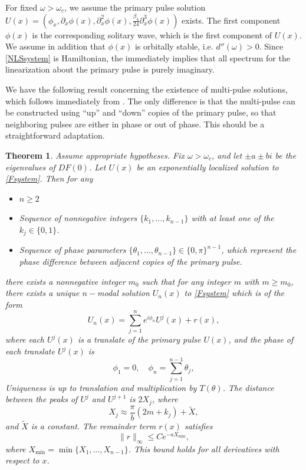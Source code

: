 \documentclass[12pt]{article}
\newtheorem{theorem}{Theorem}
\begin{document}
For fixed $\omega > \omega_c$, we assume the primary pulse solution $U(x) = (\phi_x, \partial_x \phi(x), \partial_x^2 \phi(x), \frac{\beta_4}{24} \partial_x^3 \phi(x))$ exists. The first component $\phi(x)$ is the corresponding solitary wave, which is the first component of $U(x)$. We assume in addition that $\phi(x)$ is orbitally stable, i.e. $d''(\omega) > 0$. Since \cref{NLSsystem} is Hamiltonian, the immediately implies that all spectrum for the linearization about the primary pulse is purely imaginary.

We have the following result concerning the existence of multi-pulse solutions, which follows immediately from \cite[Theorem~3.6]{SandstedeStrut}. The only difference is that the multi-pulse can be constructed using ``up'' and ``down'' copies of the primary pulse, so that neighboring pulses are either in phase or out of phase. This should be a straightforward adaptation.

\begin{theorem}\label{theorem:multiexist}
Assume appropriate hypotheses. Fix $\omega > \omega_c$, and let $\pm a \pm bi$ be the eigenvalues of $DF(0)$. Let $U(x)$ be an exponentially localized solution to \cref{Fsystem}. Then for any 
\begin{itemize}
\item $n \geq 2$
\item Sequence of nonnegative integers $\{ k_1, \dots, k_{n-1} \}$ with at least one of the $k_j \in \{0, 1 \}$.
\item Sequence of phase parameters $\{ \theta_1, \dots, \theta_{n-1} \} \in \{0, \pi \}^{n-1}$, which represent the phase difference between adjacent copies of the primary pulse. 
\end{itemize}
there exists a nonnegative integer $m_0$ such that for any integer $m$ with $m \geq m_0$, there exists a unique $n-$modal solution $U_n(x)$ to \cref{Fsystem} which is of the form
  \begin{equation}\label{qn}
  U_n(x) = \sum_{j = 1}^{n} e^{i \phi_n } U^j(x) + r(x),
  \end{equation}
  where each $U^j(x)$ is a translate of the primary pulse $U(x)$, and the phase of each translate $U^j(x)$ is
  \begin{equation}\label{phin}
  \phi_1 = 0, \quad \phi_n = \sum_{j=1}^{n-1} \theta_j, 
  \end{equation}
  Uniqueness is up to translation and multiplication by $T(\theta)$. The distance between the peaks of $U^j$ and $U^{j+1}$ is $2 X_j$, where
  \begin{equation*}
  X_j \approx \frac{\pi}{b}(2 m + k_j) + \tilde{X},
  \end{equation*}
  and $\tilde{X}$ is a constant. The remainder term $r(x)$ satisfies
  \begin{equation}\label{rbound}
  \|r\|_\infty \leq C e^{-a X_{\mathrm{min}}},
  \end{equation}
  where $X_{\mathrm{min}} = \min\{X_1, \dots, X_{n-1}\}$. This bound holds for all derivatives with respect to $x$.
\end{theorem}
\end{document}
